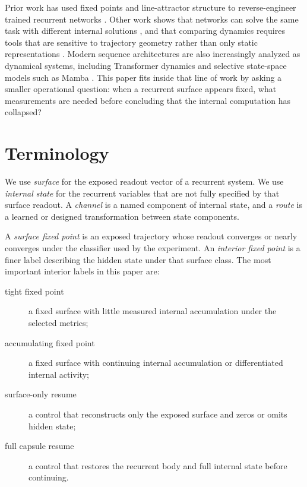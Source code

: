 \documentclass[11pt]{article}
\begin{document}
Prior work has used fixed points and line-attractor structure to
reverse-engineer trained recurrent networks \citep{maheswaranathan2019lineattractor}.
Other work shows that networks can solve the same task with different internal
solutions \citep{huang2024degeneracy}, and that comparing dynamics requires
tools that are sensitive to trajectory geometry rather than only static
representations \citep{guilhot2024dsa}. Modern sequence architectures are also
increasingly analyzed as dynamical systems, including Transformer dynamics
\citep{fernando2025transformerdynamics} and selective state-space models such
as Mamba \citep{gu2023mamba}. This paper fits inside that line of work by
asking a smaller operational question: when a recurrent surface appears fixed,
what measurements are needed before concluding that the internal computation
has collapsed?

\section{Terminology}

We use \emph{surface} for the exposed readout vector of a recurrent system.
We use \emph{internal state} for the recurrent variables that are not fully
specified by that surface readout. A \emph{channel} is a named component of
internal state, and a \emph{route} is a learned or designed transformation
between state components.

A \emph{surface fixed point} is an exposed trajectory whose readout converges
or nearly converges under the classifier used by the experiment. An
\emph{interior fixed point} is a finer label describing the hidden state under
that surface class. The most important interior labels in this paper are:

\begin{description}
  \item[tight fixed point] a fixed surface with little measured internal
  accumulation under the selected metrics;
  \item[accumulating fixed point] a fixed surface with continuing internal
  accumulation or differentiated internal activity;
  \item[surface-only resume] a control that reconstructs only the exposed
  surface and zeros or omits hidden state;
  \item[full capsule resume] a control that restores the recurrent body and
  full internal state before continuing.
\end{description}
\end{document}
